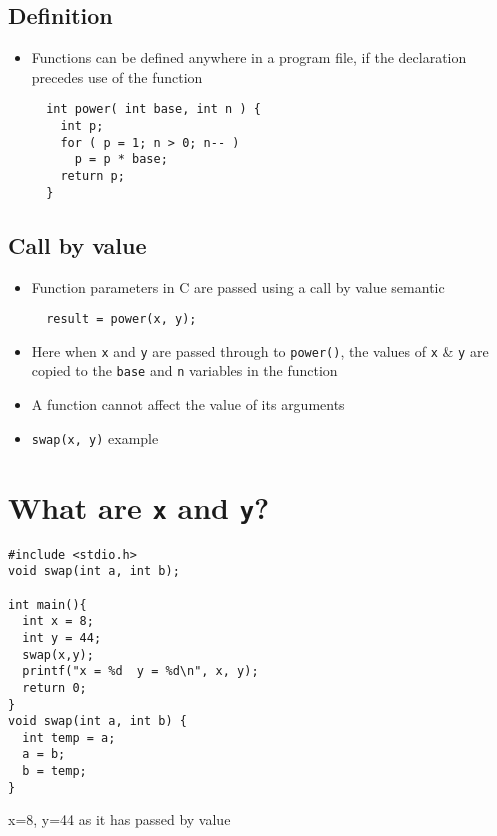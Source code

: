 \documentclass{article}
\begin{document}
\subsection{Definition}
\begin{itemize}
\item Functions can be defined anywhere in a program file, if the declaration precedes use of the function

\begin{verbatim}
  int power( int base, int n ) {
    int p;
    for ( p = 1; n > 0; n-- )
      p = p * base;
    return p;
  }
\end{verbatim}
\end{itemize}





\subsection{Call by value}
\begin{itemize}
\item Function parameters in C are passed using a call by value semantic

\begin{verbatim}
  result = power(x, y);
\end{verbatim}

\item Here when \verb!x! and \verb!y! are passed through to \verb!power()!, the values of \verb!x! \& \verb!y! are copied to the \verb!base! and \verb!n! variables in the function

\item A function cannot affect the value of its arguments
\item \verb!swap(x, y)! example
\end{itemize}



\section{What are \texttt{x} and \texttt{y}?}
\begin{verbatim}
#include <stdio.h>
void swap(int a, int b);

int main(){
  int x = 8;
  int y = 44;
  swap(x,y);
  printf("x = %d  y = %d\n", x, y);
  return 0;
}
void swap(int a, int b) {
  int temp = a;
  a = b;
  b = temp;
}
\end{verbatim}
x=8, y=44 as it has passed by value
\end{document}

